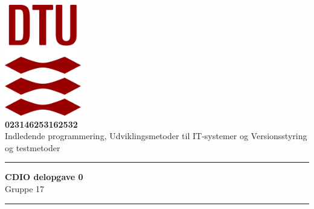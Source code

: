


\begin{titlepage}
\begin{center}

    \includegraphics[width=0.25\textwidth]{Billeder/DTULogo.png} \\
    \vspace{0.5cm}
    \Large
    \textbf{02314\hspace{1cm}62531\hspace{1cm}62532} \\
    Indledende programmering, Udviklingsmetoder til IT-systemer og Versionsstyring og testmetoder
    \vspace{0.4cm}
    \hrule
    
    \vspace*{0.5cm}
    \huge
    \textbf{CDIO delopgave 0}\\
    \LARGE
    Gruppe 17
    \vspace{0.5cm}
    \hrule
    \vspace{0.2cm}


\end{center}
\end{titlepage}
